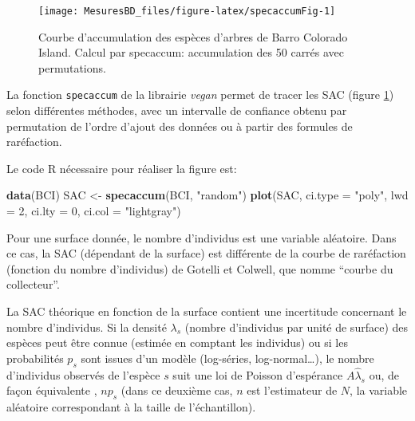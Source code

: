\documentclass[
  11pt,
  french,
  a4paper,
  extrafontsizes,onecolumn,openright
  ]{memoir}
\newenvironment{Shaded}{\begin{snugshade}}{\end{snugshade}}
\newcommand{\DataTypeTok}[1]{\textcolor[rgb]{0.13,0.29,0.53}{#1}}
\newcommand{\DecValTok}[1]{\textcolor[rgb]{0.00,0.00,0.81}{#1}}
\newcommand{\KeywordTok}[1]{\textcolor[rgb]{0.13,0.29,0.53}{\textbf{#1}}}
\newcommand{\NormalTok}[1]{#1}
\newcommand{\StringTok}[1]{\textcolor[rgb]{0.31,0.60,0.02}{#1}}
\begin{document}
\scriptsize

\begin{figure}

{\centering \texttt{[image: MesuresBD\_files/figure-latex/specaccumFig-1]} 

}

\caption{Courbe d'accumulation des espèces d'arbres de Barro Colorado Island. Calcul par specaccum: accumulation des 50 carrés avec permutations.}\label{fig:specaccumFig}
\end{figure}

\normalsize

La fonction \texttt{specaccum} de la librairie \emph{vegan} \autocite{Oksanen2012} permet de tracer les SAC (figure \ref{fig:specaccumFig}) selon différentes méthodes, avec un intervalle de confiance obtenu par permutation de l'ordre d'ajout des données ou à partir des formules de raréfaction.

Le code R nécessaire pour réaliser la figure est:

\scriptsize

\begin{Shaded}
\begin{Highlighting}[]
\KeywordTok{data}\NormalTok{(BCI)}
\NormalTok{SAC <-}\StringTok{ }\KeywordTok{specaccum}\NormalTok{(BCI, }\StringTok{"random"}\NormalTok{)}
\KeywordTok{plot}\NormalTok{(SAC, }\DataTypeTok{ci.type =} \StringTok{"poly"}\NormalTok{, }\DataTypeTok{lwd =} \DecValTok{2}\NormalTok{, }\DataTypeTok{ci.lty =} \DecValTok{0}\NormalTok{, }\DataTypeTok{ci.col =} \StringTok{"lightgray"}\NormalTok{)}
\end{Highlighting}
\end{Shaded}

\normalsize

Pour une surface donnée, le nombre d'individus est une variable aléatoire.
Dans ce cas, la SAC (dépendant de la surface) est différente de la courbe de raréfaction (fonction du nombre d'individus) de Gotelli et Colwell, que \textcite{Coleman1981} nomme ``courbe du collecteur''.

La SAC théorique en fonction de la surface contient une incertitude concernant le nombre d'individus.
Si la densité \(\lambda_s\) (nombre d'individus par unité de surface) des espèces peut être connue (estimée en comptant les individus) ou si les probabilités \(p_s\) sont issues d'un modèle (log-séries, log-normal\ldots), le nombre d'individus observés de l'espèce \(s\) suit une loi de Poisson d'espérance \(A\hat{\lambda}_s\) ou, de façon équivalente \autocite[pages 204-205]{Pielou1969}, \(np_s\) (dans ce deuxième cas, \(n\) est l'estimateur de \(N\), la variable aléatoire correspondant à la taille de l'échantillon).
\end{document}
